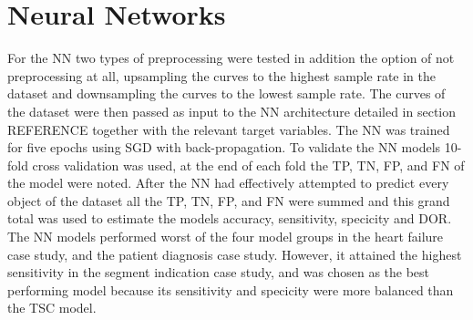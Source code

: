 \section{Neural Networks}

For the NN two types of preprocessing were tested in addition the option of not preprocessing at all, upsampling the curves to the highest sample rate in the dataset and downsampling the curves to the lowest sample rate. The curves of the dataset were then passed as input to the NN architecture detailed in section REFERENCE together with the relevant target variables. The NN was trained for five epochs using SGD with back-propagation. To validate the NN models 10-fold cross validation was used, at the end of each fold the TP, TN, FP, and FN of the model were noted. After the NN had effectively attempted to predict every object of the dataset all the TP, TN, FP, and FN were summed and this grand total was used to estimate the models accuracy, sensitivity, specicity and DOR.
The NN models performed worst of the four model groups in the heart failure case study, and the patient diagnosis case study. However, it attained the highest sensitivity in the segment indication case study, and was chosen as the best performing model because its sensitivity and specicity were more balanced than the TSC model.
